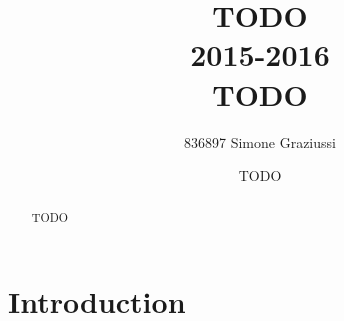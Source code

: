 \documentclass[11pt,a4paper,notitlepage]{article}
\title{\Large{TODO\\2015-2016}\\\Huge{TODO}}
\author{836897 Simone Graziussi}
\date{TODO}
\begin{document}
\sloppy


\begin{titlingpage}
    \maketitle
    \begin{abstract}
        \large{TODO}
    \end{abstract}
\end{titlingpage}



\newpage
\tableofcontents
\newpage



\part{Introduction}
\end{document}
